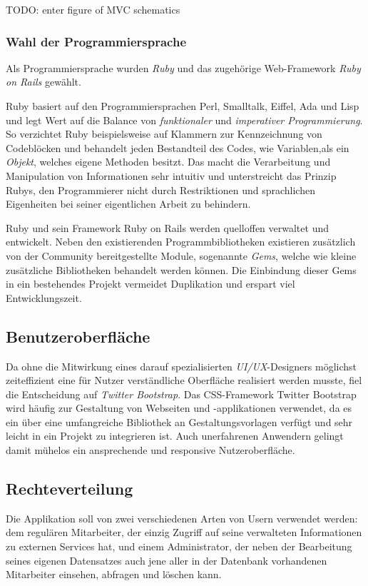 TODO: enter figure of MVC schematics

\subsubsection{Wahl der Programmiersprache}
\label{sec:Wahl der Programmiersprache}
Als Programmiersprache wurden \textit{Ruby} und das zugehörige Web-Framework \textit{Ruby on Rails}
gewählt.

Ruby basiert auf den Programmiersprachen Perl, Smalltalk, Eiffel, Ada und Lisp und legt Wert auf
die Balance von \textit{funktionaler} und \textit{imperativer Programmierung}. So verzichtet Ruby
beispielsweise auf Klammern zur Kennzeichnung von Codeblöcken und behandelt jeden Bestandteil des
Codes, wie Variablen,als ein \textit{Objekt}, welches eigene Methoden besitzt. Das macht die
Verarbeitung und Manipulation von Informationen sehr intuitiv und unterstreicht das Prinzip Rubys,
den Programmierer nicht durch Restriktionen und sprachlichen Eigenheiten bei seiner eigentlichen
Arbeit zu behindern.

Ruby und sein Framework Ruby on Rails werden quelloffen verwaltet und entwickelt. Neben den
existierenden Programmbibliotheken existieren zusätzlich von der Community bereitgestellte Module,
sogenannte \textit{Gems}, welche wie kleine zusätzliche Bibliotheken behandelt werden können. Die
Einbindung dieser Gems in ein bestehendes Projekt vermeidet Duplikation und erspart viel
Entwicklungszeit.

\subsection{Benutzeroberfläche}
\label{sec:Benutzeroberfläche}
Da ohne die Mitwirkung eines darauf spezialisierten \textit{UI/UX}-Designers möglichst zeiteffizient
eine für Nutzer verständliche Oberfläche realisiert werden musste, fiel die Entscheidung auf
\textit{Twitter Bootstrap}.
Das CSS-Framework Twitter Bootstrap wird häufig zur Gestaltung von Webseiten und
-applikationen verwendet, da es ein über eine umfangreiche Bibliothek an Gestaltungsvorlagen
verfügt und sehr leicht in ein Projekt zu integrieren ist. Auch unerfahrenen Anwendern gelingt damit
mühelos ein ansprechende und responsive Nutzeroberfläche.

\subsection{Rechteverteilung}
\label{sec:Rechteverteilung}
Die Applikation soll von zwei verschiedenen Arten von Usern verwendet werden: dem regulären
Mitarbeiter, der einzig Zugriff auf seine verwalteten Informationen zu externen Services hat, und
einem Administrator, der neben der Bearbeitung seines eigenen Datensatzes auch jene aller in der
Datenbank vorhandenen Mitarbeiter einsehen, abfragen und löschen kann.

